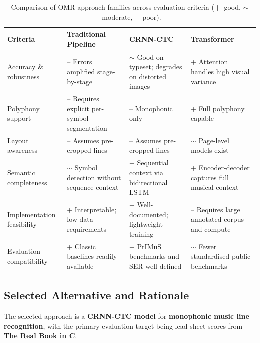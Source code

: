 \documentclass[11pt, a4paper]{article}
\begin{document}
\begin{table}[h!]
    \centering
    \caption{Comparison of OMR approach families across evaluation criteria
    (\textbf{+}~good, \textbf{$\sim$}~moderate, \textbf{--}~poor).}
    \label{tab:approach-comparison}
    \renewcommand{\arraystretch}{1.4}
    \begin{tabularx}{\linewidth}{>{}p{3.8cm} X X X}
        \toprule
        \textbf{Criteria}
            & \textbf{Traditional Pipeline}~\cite{dalitzComparativeStudyStaff2008}
            & \textbf{CRNN-CTC}~\cite{PrIMuSDataset,opticalmusicrecognitionresearchSelfLearningOpticalMusic2019}
            & \textbf{Transformer}~\cite{vilaAntoniorv6SMT2026,UfalOlimpicicdar24Practical} \\
        \midrule
        Accuracy \& robustness
            & -- Errors amplified stage-by-stage
            & $\sim$ Good on typeset; degrades on distorted images
            & + Attention handles high visual variance \\
        \addlinespace
        Polyphony support
            & -- Requires explicit per-symbol segmentation
            & -- Monophonic only
            & + Full polyphony capable \\
        \addlinespace
        Layout awareness
            & -- Assumes pre-cropped lines
            & -- Assumes pre-cropped lines
            & $\sim$ Page-level models exist \\
        \addlinespace
        Semantic completeness
            & $\sim$ Symbol detection without sequence context
            & + Sequential context via bidirectional LSTM
            & + Encoder-decoder captures full musical context \\
        \addlinespace
        Implementation feasibility
            & + Interpretable; low data requirements
            & + Well-documented; lightweight training
            & -- Requires large annotated corpus and compute \\
        \addlinespace
        Evaluation compatibility
            & + Classic baselines readily available
            & + PrIMuS benchmarks and SER well-defined
            & $\sim$ Fewer standardised public benchmarks \\
        \bottomrule
    \end{tabularx}
\end{table}

\subsection{Selected Alternative and Rationale}
The selected approach is a \textbf{CRNN-CTC model} for \textbf{monophonic music line recognition}, with the primary evaluation target being lead-sheet scores from \textbf{The Real Book in C}.
\end{document}
